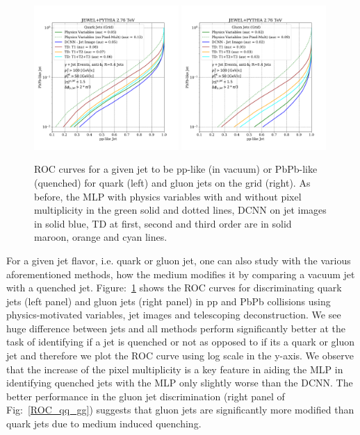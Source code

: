 \documentclass[notoc]{JHEP3}
\begin{document}
\begin{figure}[t]
	   \centering
	   \includegraphics[width=0.49\textwidth]{plots/JEWELPYTHIA_2p76TeV_quark_ppvspbpb.pdf}
	   \includegraphics[width=0.49\textwidth]{plots/JEWELPYTHIA_2p76TeV_gluon_ppvspbpb.pdf}
	   \caption{ROC curves for a given jet to be pp-like (in vacuum) or PbPb-like (quenched) for quark (left) and gluon jets on the grid (right). As before, the MLP with physics variables with and without pixel multiplicity in the green solid and dotted lines, DCNN on jet images in solid blue, TD at first, second and third order are in solid maroon, orange and cyan lines.}
\label{fig:ROC_qq_gg}
\end{figure}

For a given jet flavor, i.e. quark or gluon jet, one can also study with the various aforementioned methods, how the medium modifies it by comparing a vacuum jet with a quenched jet. Figure:~\ref{fig:ROC_qq_gg} shows the ROC curves for discriminating quark jets (left panel) and gluon jets (right panel) in pp and PbPb collisions using physics-motivated variables, jet images and telescoping deconstruction. We see huge difference between jets and all methods perform significantly better at the task of identifying if a jet is quenched or not as opposed to if its a quark or gluon jet and therefore we plot the ROC curve using log scale in the y-axis. We observe that the increase of the pixel multiplicity is a key feature in aiding the MLP in identifying quenched jets with the MLP only slightly worse than the DCNN. The better performance in the gluon jet discrimination (right panel of Fig:~\ref{ROC_qq_gg}) suggests that gluon jets are significantly more modified than quark jets due to medium induced quenching.
\end{document}

